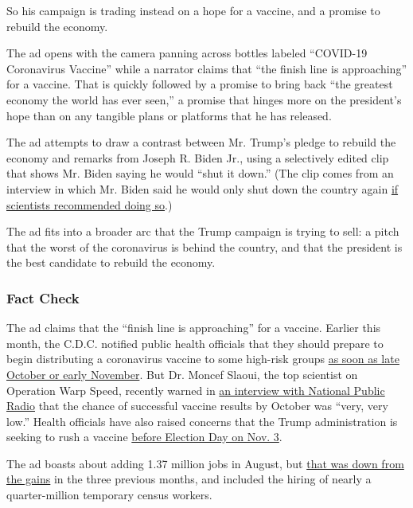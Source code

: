 So his campaign is trading instead on a hope for a vaccine, and a
promise to rebuild the economy.

The ad opens with the camera panning across bottles labeled ``COVID-19
Coronavirus Vaccine'' while a narrator claims that ``the finish line is
approaching'' for a vaccine. That is quickly followed by a promise to
bring back ``the greatest economy the world has ever seen,'' a promise
that hinges more on the president's hope than on any tangible plans or
platforms that he has released.

The ad attempts to draw a contrast between Mr. Trump's pledge to rebuild
the economy and remarks from Joseph R. Biden Jr., using a selectively
edited clip that shows Mr. Biden saying he would ``shut it down.'' (The
clip comes from an interview in which Mr. Biden said he would only shut
down the country again
\href{https://www.cnn.com/2020/08/22/politics/biden-coronavirus-shutdown/index.html}{if
scientists recommended doing so}.)

The ad fits into a broader arc that the Trump campaign is trying to
sell: a pitch that the worst of the coronavirus is behind the country,
and that the president is the best candidate to rebuild the economy.

\hypertarget{fact-check}{%
\subsubsection{Fact Check}\label{fact-check}}

The ad claims that the ``finish line is approaching'' for a vaccine.
Earlier this month, the C.D.C. notified public health officials that
they should prepare to begin distributing a coronavirus vaccine to some
high-risk groups
\href{https://www.nytimes3xbfgragh.onion/2020/09/02/health/covid-19-vaccine-cdc-plans.html}{as
soon as late October or early November}. But Dr. Moncef Slaoui, the top
scientist on Operation Warp Speed, recently warned in
\href{https://www.npr.org/2020/09/03/909312697/operation-warp-speed-top-adviser-on-the-status-of-a-coronavirus-vaccine}{an
interview with National Public Radio} that the chance of successful
vaccine results by October was ``very, very low.'' Health officials have
also raised concerns that the Trump administration is seeking to rush a
vaccine
\href{https://www.nytimes3xbfgragh.onion/2020/09/02/health/covid-19-vaccine-cdc-plans.html}{before
Election Day on Nov. 3}.

The ad boasts about adding 1.37 million jobs in August, but
\href{https://www.nytimes3xbfgragh.onion/2020/09/04/business/economy/jobs-report.html?utm_source=ground.news\&utm_medium=referral}{that
was down from the gains} in the three previous months, and included the
hiring of nearly a quarter-million temporary census workers.

